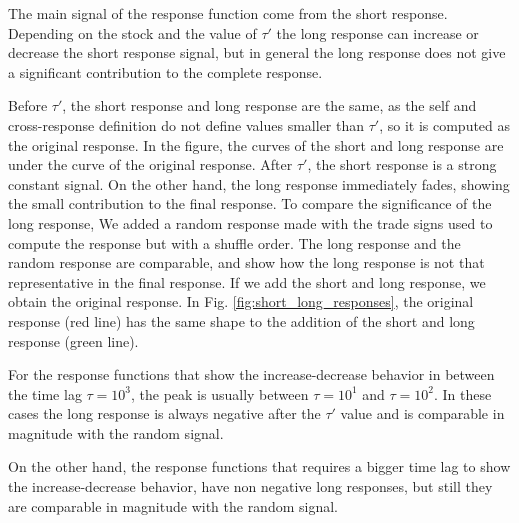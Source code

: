 The main signal of the response function come from the short response. Depending
on the stock and the value of $\tau'$ the long response can increase or decrease
the short response signal, but in general the long response does not give a
significant contribution to the complete response.

Before $\tau'$, the short response and long response are the same, as the self
and cross-response definition do not define values smaller
than $\tau '$, so it is computed as the original response. In the figure, the
curves of the short and long response are under the curve of the original response. After $\tau'$, the
short response is a strong constant signal. On the other hand, the long
response immediately fades, showing the small contribution to the final
response. To compare the significance of the long response, We added a random
response made with the trade signs used to compute the response but with a
shuffle order. The long response and the random response are comparable, and
show how the long response is not that representative in the final response.
If we add the short and long response, we obtain the original response. In Fig.
\ref{fig:short_long_responses}, the original response (red line) has the same
shape to the addition of the short and long response (green line).

For the response functions that show the increase-decrease behavior in between
the time lag $\tau = 10^{3}$, the peak is usually between $\tau = 10^{1}$ and
$\tau = 10^{2}$. In these cases the long response is always negative after the
$\tau'$ value and is comparable in magnitude with the random signal.

On the other hand, the response functions that requires a bigger time lag to
show the increase-decrease behavior, have non negative long responses, but still
they are comparable in magnitude with the random signal.